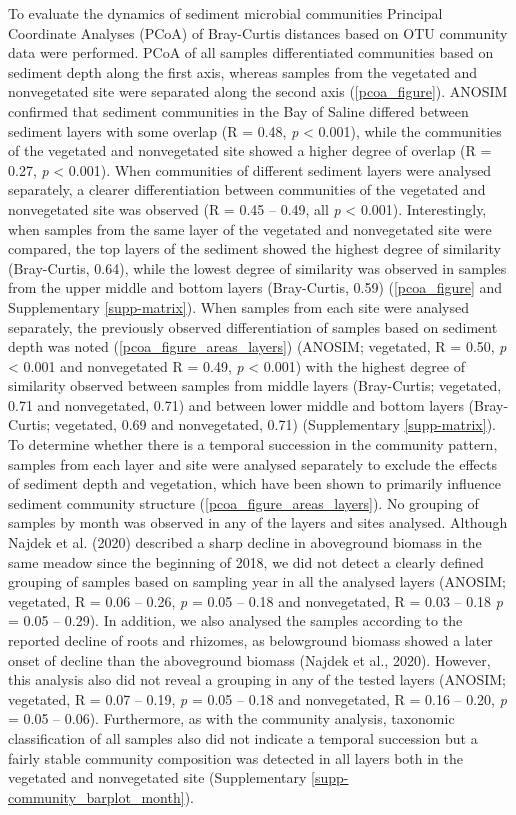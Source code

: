\documentclass[12pt,]{article}
\begin{document}
To evaluate the dynamics of sediment microbial communities Principal
Coordinate Analyses (PCoA) of Bray-Curtis distances based on OTU
community data were performed. PCoA of all samples differentiated
communities based on sediment depth along the first axis, whereas
samples from the vegetated and nonvegetated site were separated along
the second axis (\autoref{pcoa_figure}). ANOSIM confirmed that sediment
communities in the Bay of Saline differed between sediment layers with
some overlap (R = 0.48, \emph{p} \textless{} 0.001), while the
communities of the vegetated and nonvegetated site showed a higher
degree of overlap (R = 0.27, \emph{p} \textless{} 0.001). When
communities of different sediment layers were analysed separately, a
clearer differentiation between communities of the vegetated and
nonvegetated site was observed (R = 0.45 -- 0.49, all \emph{p}
\textless{} 0.001). Interestingly, when samples from the same layer of
the vegetated and nonvegetated site were compared, the top layers of the
sediment showed the highest degree of similarity (Bray-Curtis, 0.64),
while the lowest degree of similarity was observed in samples from the
upper middle and bottom layers (Bray-Curtis, 0.59)
(\autoref{pcoa_figure} and Supplementary \autoref{supp-matrix}). When
samples from each site were analysed separately, the previously observed
differentiation of samples based on sediment depth was noted
(\autoref{pcoa_figure_areas_layers}) (ANOSIM; vegetated, R = 0.50,
\emph{p} \textless{} 0.001 and nonvegetated R = 0.49, \emph{p}
\textless{} 0.001) with the highest degree of similarity observed
between samples from middle layers (Bray-Curtis; vegetated, 0.71 and
nonvegetated, 0.71) and between lower middle and bottom layers
(Bray-Curtis; vegetated, 0.69 and nonvegetated, 0.71) (Supplementary
\autoref{supp-matrix}). To determine whether there is a temporal
succession in the community pattern, samples from each layer and site
were analysed separately to exclude the effects of sediment depth and
vegetation, which have been shown to primarily influence sediment
community structure (\autoref{pcoa_figure_areas_layers}). No grouping of
samples by month was observed in any of the layers and sites analysed.
Although Najdek et al. (2020) described a sharp decline in aboveground
biomass in the same meadow since the beginning of 2018, we did not
detect a clearly defined grouping of samples based on sampling year in
all the analysed layers (ANOSIM; vegetated, R = 0.06 -- 0.26, \emph{p} =
0.05 -- 0.18 and nonvegetated, R = 0.03 -- 0.18 \emph{p} = 0.05 --
0.29). In addition, we also analysed the samples according to the
reported decline of roots and rhizomes, as belowground biomass showed a
later onset of decline than the aboveground biomass (Najdek et al.,
2020). However, this analysis also did not reveal a grouping in any of
the tested layers (ANOSIM; vegetated, R = 0.07 -- 0.19, \emph{p} = 0.05
-- 0.18 and nonvegetated, R = 0.16 -- 0.20, \emph{p} = 0.05 -- 0.06).
Furthermore, as with the community analysis, taxonomic classification of
all samples also did not indicate a temporal succession but a fairly
stable community composition was detected in all layers both in the
vegetated and nonvegetated site (Supplementary
\autoref{supp-community_barplot_month}).
\end{document}
